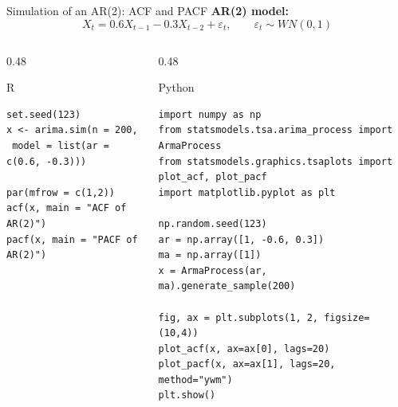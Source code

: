 \documentclass[aspectratio=169]{beamer}
\begin{document}
\begin{frame}[fragile]{Simulation of an AR(2): ACF and PACF}
\small
\textbf{AR(2) model:}
\[
X_t = 0.6X_{t-1} - 0.3X_{t-2} + \varepsilon_t,
\qquad \varepsilon_t \sim WN(0,1)
\]

\begin{columns}[T]
\begin{column}{0.48\textwidth}
\begin{block}{R}
\begin{verbatim}
set.seed(123)
x <- arima.sim(n = 200,
 model = list(ar = c(0.6, -0.3)))

par(mfrow = c(1,2))
acf(x, main = "ACF of AR(2)")
pacf(x, main = "PACF of AR(2)")
\end{verbatim}
\end{block}
\end{column}

\begin{column}{0.48\textwidth}
\begin{block}{Python}
\begin{verbatim}
import numpy as np
from statsmodels.tsa.arima_process import ArmaProcess
from statsmodels.graphics.tsaplots import plot_acf, plot_pacf
import matplotlib.pyplot as plt

np.random.seed(123)
ar = np.array([1, -0.6, 0.3])
ma = np.array([1])
x = ArmaProcess(ar, ma).generate_sample(200)

fig, ax = plt.subplots(1, 2, figsize=(10,4))
plot_acf(x, ax=ax[0], lags=20)
plot_pacf(x, ax=ax[1], lags=20, method="ywm")
plt.show()
\end{verbatim}
\end{block}
\end{column}
\end{columns}
\end{frame}
\end{document}
